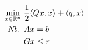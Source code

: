 \begin{definition}
\begin{align}
  \min_{x \in \mathbb{R}^n}\ &
    \frac{1}{2} \langle Qx,x \rangle + \langle q,x \rangle \\
  \text{\em Nb. } & Ax = b \notag \\
      & Gx \leq r \notag
\end{align}
\end{definition}
